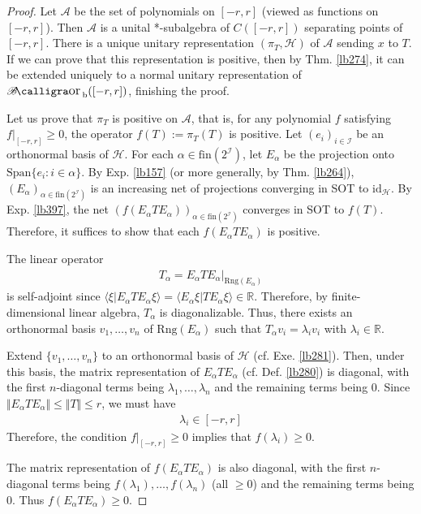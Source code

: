 \documentclass[12pt,b5paper,notitlepage]{article}
\theoremstyle{definition}
\theoremstyle{plain}
\DeclareMathOperator{\Borb}{{\mathscr{B}\text{\kern -2pt {\calligra\large or}}\,}_{\mathrm b}}
\newcommand{\id}{\mathrm{id}}
\newcommand{\Span}{\mathrm{Span}}
\newcommand{\bk}[1]{\langle {#1}\rangle}
\newcommand{\scr}{\mathscr}
\newcommand{\Rbb}{\mathbb R}
\newcommand{\Rng}{\mathrm{Rng}}
\newcommand{\fin}{\mathrm{fin}}
\newcommand{\MH}{\mathcal H}
\numberwithin{equation}{section}
\begin{document}
\begin{proof}
Let $\scr A$ be the set of polynomials on $[-r,r]$ (viewed as functions on $[-r,r]$). Then $\scr A$ is a unital *-subalgebra of $C([-r,r])$ separating points of $[-r,r]$. There is a unique unitary representation $(\pi_T,\MH)$ of $\scr A$ sending $x$ to $T$. If we can prove that this representation is positive, then by Thm. \ref{lb274}, it can be extended uniquely to a normal unitary representation of $\Borb([-r,r])$, finishing the proof.

Let us prove that $\pi_T$ is positive on $\scr A$, that is, for any polynomial $f$ satisfying $f|_{[-r,r]}\geq0$, the operator $f(T):=\pi_T(T)$ is positive. Let $(e_i)_{i\in\scr I}$ be an orthonormal basis of $\MH$. For each $\alpha\in\fin(2^{\scr I})$, let $E_\alpha$ be the projection onto $\Span\{e_i:i\in\alpha\}$. By Exp. \ref{lb157} (or more generally, by Thm. \ref{lb264}), $(E_\alpha)_{\alpha\in\fin(2^{\scr I})}$ is an increasing net of projections converging in SOT to $\id_\MH$. By Exp. \ref{lb397}, the net $(f(E_\alpha TE_\alpha))_{\alpha\in\fin(2^{\scr I})}$ converges in SOT to $f(T)$. Therefore, it suffices to show that each $f(E_\alpha TE_\alpha)$ is positive.


The linear operator
\begin{align*}
T_\alpha=E_\alpha TE_\alpha\big|_{\Rng(E_\alpha)}
\end{align*}
is self-adjoint since $\bk{\xi|E_\alpha TE_\alpha\xi}=\bk{E_\alpha\xi|TE_\alpha\xi}\in\Rbb$. Therefore, by finite-dimensional linear algebra, $T_\alpha$ is diagonalizable. Thus, there exists an orthonormal basis $v_1,\dots,v_n$ of $\Rng(E_\alpha)$ such that $T_\alpha v_i=\lambda_iv_i$ with $\lambda_i\in\Rbb$. 

Extend $\{v_1,\dots,v_n\}$ to an orthonormal basis of $\MH$ (cf. Exe. \ref{lb281}). Then, under this basis, the matrix representation of $E_\alpha TE_\alpha$ (cf. Def. \ref{lb280}) is diagonal, with the first $n$-diagonal terms being $\lambda_1,\dots,\lambda_n$ and the remaining terms being $0$. Since $\Vert E_\alpha TE_\alpha\Vert\leq\Vert T\Vert\leq r$, we must have
\begin{align*}
\lambda_i\in[-r,r]
\end{align*}
Therefore, the condition $f|_{[-r,r]}\geq0$ implies that $f(\lambda_i)\geq0$. 

The matrix representation of $f(E_\alpha TE_\alpha)$ is also diagonal, with the first $n$-diagonal terms being $f(\lambda_1),\dots,f(\lambda_n)$ (all $\geq0$) and the remaining terms being $0$. Thus $f(E_\alpha TE_\alpha)\geq0$.
\end{proof}
\end{document}
